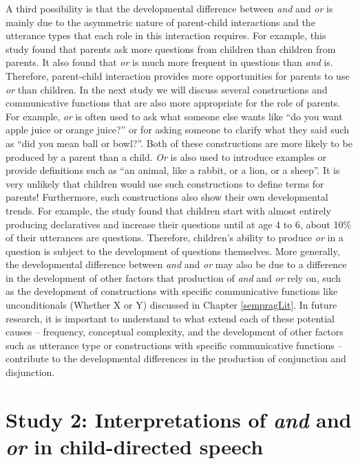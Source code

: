 \documentclass[oneside]{report}
\theoremstyle{definition}
\theoremstyle{definition}
\theoremstyle{definition}
\theoremstyle{remark}
\begin{document}
A third possibility is that the developmental difference between
\emph{and} and \emph{or} is mainly due to the asymmetric nature of
parent-child interactions and the utterance types that each role in this
interaction requires. For example, this study found that parents ask
more questions from children than children from parents. It also found
that \emph{or} is much more frequent in questions than \emph{and} is.
Therefore, parent-child interaction provides more opportunities for
parents to use \emph{or} than children. In the next study we will
discuss several constructions and communicative functions that are also
more appropriate for the role of parents. For example, \emph{or} is
often used to ask what someone else wants like ``do you want apple juice
or orange juice?'' or for asking someone to clarify what they said such
as ``did you mean ball or bowl?''. Both of these constructions are more
likely to be produced by a parent than a child. \emph{Or} is also used
to introduce examples or provide definitions such as ``an animal, like a
rabbit, or a lion, or a sheep''. It is very unlikely that children would
use such constructions to define terms for parents! Furthermore, such
constructions also show their own developmental trends. For example, the
study found that children start with almost entirely producing
declaratives and increase their questions until at age 4 to 6, about
10\% of their utterances are questions. Therefore, children's ability to
produce \emph{or} in a question is subject to the development of
questions themselves. More generally, the developmental difference
between \emph{and} and \emph{or} may also be due to a difference in the
development of other factors that production of \emph{and} and \emph{or}
rely on, such as the development of constructions with specific
communicative functions like unconditionals (Whether X or Y) discussed
in Chapter \ref{sempragLit}. In future research, it is important to
understand to what extend each of these potential causes -- frequency,
conceptual complexity, and the development of other factors such as
utterance type or constructions with specific communicative functions --
contribute to the developmental differences in the production of
conjunction and disjunction.

\section{\texorpdfstring{Study 2: Interpretations of \emph{and} and
\emph{or} in child-directed
speech}{Study 2: Interpretations of and and or in child-directed speech}}\label{study-2-interpretations-of-and-and-or-in-child-directed-speech}
\end{document}
